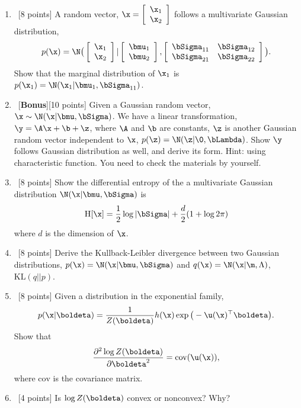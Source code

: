\documentclass[12pt, fullpage,letterpaper]{article}
\begin{document}
\begin{enumerate}
\item~[8 points] A random vector, $\x = \left[\begin{array}{c}\x_1 \\  \x_2\end{array}\right]$ follows a multivariate Gaussian distribution, 
\[
p(\x) = \N\big( \left[\begin{array}{c}\x_1 \\  \x_2\end{array}\right] |  \left[\begin{array}{c}\bmu_1 \\  \bmu_2\end{array}\right], \left[\begin{array}{cc} \bSigma_{11} & \bSigma_{12} \\  \bSigma_{21} & \bSigma_{22}\end{array}\right]\big).
\]
Show that the marginal distribution of $\x_1$ is $p(\x_1) = \N(\x_1| \bmu_1, \bSigma_{11})$.

\item~[\textbf{Bonus}][10 points] Given a Gaussian random vector, $\x \sim \N(\x|\bmu, \bSigma)$.  We have a linear transformation, $\y = \A\x + \b + \z$, where $\A$ and $\b$ are constants, $\z$ is another Gaussian random vector independent to $\x$, $p(\z) = \N(\z|\0, \bLambda)$. Show $\y$ follows Gaussian distribution as well, and derive its form. Hint: using characteristic function. You need to check the materials by yourself. 

\item~[8 points] Show the differential entropy of the a multivariate Gaussian distribution $\N(\x|\bmu, \bSigma)$ is
\[
\mathrm{H}[\x] = \frac{1}{2}\log |\bSigma| + \frac{d}{2}(1 + \log 2\pi)
\]
where $d$ is the dimension of $\x$.
\item~[8 points] Derive the Kullback-Leibler divergence between two Gaussian distributions, $p(\x) = \N(\x|\bmu, \bSigma)$ and $q(\x) = \N(\x|\m, \Lambda)$, \ie $\mathrm{KL}(q || p)$.

\item~[8 points] Given a distribution in the exponential family, 
\[
p(\x|\boldeta) = \frac{1}{Z(\boldeta)} h(\x)\exp\big(-\u(\x)^\top \boldeta\big).
\]
Show that 
\[
\frac{\partial^2 \log Z(\boldeta)}{\partial \boldeta^2} = \mathrm{cov}(\u(\x)), 
\]
where $\mathrm{cov}$ is the covariance matrix. 

\item~[4 points] Is $\log Z(\boldeta)$ convex or nonconvex? Why?



\end{enumerate}
\end{document}
